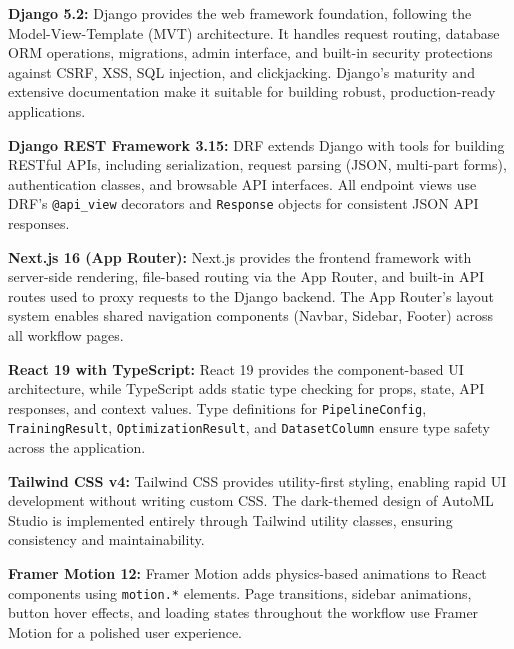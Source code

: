 \documentclass[12pt,a4paper]{report}
\begin{document}
\vspace{0.4cm}

\textbf{Django 5.2:}
Django provides the web framework foundation, following the Model-View-Template (MVT) architecture. It handles request routing, database ORM operations, migrations, admin interface, and built-in security protections against CSRF, XSS, SQL injection, and clickjacking. Django's maturity and extensive documentation make it suitable for building robust, production-ready applications.

\vspace{0.4cm}

\textbf{Django REST Framework 3.15:}
DRF extends Django with tools for building RESTful APIs, including serialization, request parsing (JSON, multi-part forms), authentication classes, and browsable API interfaces. All endpoint views use DRF's \texttt{@api\_view} decorators and \texttt{Response} objects for consistent JSON API responses.

\vspace{0.4cm}

\textbf{Next.js 16 (App Router):}
Next.js provides the frontend framework with server-side rendering, file-based routing via the App Router, and built-in API routes used to proxy requests to the Django backend. The App Router's layout system enables shared navigation components (Navbar, Sidebar, Footer) across all workflow pages.

\vspace{0.4cm}

\textbf{React 19 with TypeScript:}
React 19 provides the component-based UI architecture, while TypeScript adds static type checking for props, state, API responses, and context values. Type definitions for \texttt{PipelineConfig}, \texttt{TrainingResult}, \texttt{OptimizationResult}, and \texttt{DatasetColumn} ensure type safety across the application.

\vspace{0.4cm}

\textbf{Tailwind CSS v4:}
Tailwind CSS provides utility-first styling, enabling rapid UI development without writing custom CSS. The dark-themed design of AutoML Studio is implemented entirely through Tailwind utility classes, ensuring consistency and maintainability.

\vspace{0.4cm}

\textbf{Framer Motion 12:}
Framer Motion adds physics-based animations to React components using \texttt{motion.*} elements. Page transitions, sidebar animations, button hover effects, and loading states throughout the workflow use Framer Motion for a polished user experience.
\end{document}
